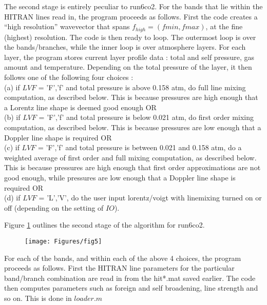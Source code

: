 \documentclass[11pt]{article}
\begin{document}
The second stage is entirely peculiar to run6co2. For the bands that lie 
within the HITRAN lines read in, the program proceeds as follows. First the 
code creates a ``high resolution'' wavevector that spans 
$f_{high}=(fmin,fmax)$, at 
the fine (highest) resolution. The code is then ready to loop. The
outermost loop is over the bands/branches, while the inner loop is over 
atmosphere layers. For each layer, the program stores current layer profile 
data : total and self pressure, gas amount and temperature. Depending on 
the total pressure of the layer, it then follows one of the following four 
choices : \\
(a) if $LVF$  = 'F','f' and total pressure is above 0.158 atm, do full line
    mixing computation, as described below. This is because pressures are
    high enough that a Lorentz line shape is deemed good enough OR\\
(b) if $LVF$  = 'F','f' and total pressure is below 0.021 atm, do first 
    order
    mixing computation, as described below. This is because pressures are
    low enough that a Doppler line shape is required OR\\
(c) if $LVF$  = 'F','f' and total pressure is between 0.021 and 0.158 atm, 
    do a weighted average of first order and full mixing computation, as 
    described below. This is because pressures are high enough that first 
    order approximations are not good enough, while pressures are low 
    enough 
    that a Doppler line shape is required OR \\
(d) if $LVF$ = 'L','V', do the user input lorentz/voigt with linemixing 
    turned on or off (depending on the setting of $IO$).

Figure \ref{fig:PQRloop_CO2} outlines the second stage of the algorithm for 
run6co2.

\begin{figure}
  \begin{center}\texttt{[image: Figures/fig5]}
  \end{center}
  \caption[Outline of PQR band loop details for CO2]{}
  \label{fig:PQRloop_CO2}
\end{figure}

For each of the bands, and within each of the above 4 choices, the program 
proceeds as follows. First the HITRAN line parameters for the particular 
band/branch combination are read in from the hit*.mat saved earlier. The 
code then computes parameters such as foreign and self broadening, line 
strength and so on. This is done in $loader.m$ 
\end{document}

